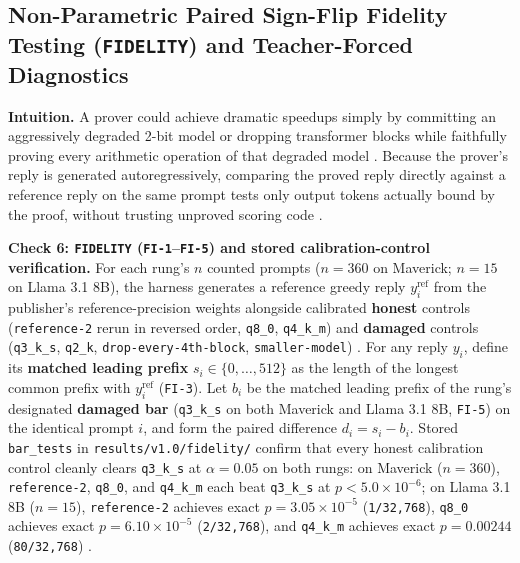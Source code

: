 \documentclass[11pt,letterpaper]{article}
\begin{document}
\subsection{Non-Parametric Paired Sign-Flip Fidelity Testing (\texttt{FIDELITY}) and Teacher-Forced Diagnostics}

\textbf{Intuition.} A prover could achieve dramatic speedups simply by committing an aggressively degraded 2-bit model or dropping transformer blocks while faithfully proving every arithmetic operation of that degraded model \cite{iproofs2026,rinberg2026flashprove}. Because the prover's reply is generated autoregressively, comparing the proved reply directly against a reference reply on the same prompt tests only output tokens actually bound by the proof, without trusting unproved scoring code \cite{iproofs2026}.

\textbf{Check 6: \texttt{FIDELITY} (\texttt{FI-1}--\texttt{FI-5}) and stored calibration-control verification.} For each rung's $n$ counted prompts ($n = 360$ on Maverick; $n = 15$ on Llama 3.1 8B), the harness generates a reference greedy reply $y_i^{\text{ref}}$ from the publisher's reference-precision weights alongside calibrated \textbf{honest} controls (\texttt{reference-2} rerun in reversed order, \texttt{q8\_\allowbreak{}0}, \texttt{q4\_\allowbreak{}k\_\allowbreak{}m}) and \textbf{damaged} controls (\texttt{q3\_\allowbreak{}k\_\allowbreak{}s}, \texttt{q2\_\allowbreak{}k}, \texttt{drop-\allowbreak{}every-4th-\allowbreak{}block}, \texttt{smaller-\allowbreak{}model}) \cite{iproofs2026}. For any reply $y_i$, define its \textbf{matched leading prefix} $s_i \in \{0, \dots, 512\}$ as the length of the longest common prefix with $y_i^{\text{ref}}$ (\texttt{FI-3}). Let $b_i$ be the matched leading prefix of the rung's designated \textbf{damaged bar} (\texttt{q3\_\allowbreak{}k\_\allowbreak{}s} on both Maverick and Llama 3.1 8B, \texttt{FI-5}) on the identical prompt $i$, and form the paired difference $d_i = s_i - b_i$. Stored \texttt{bar\_\allowbreak{}tests} in \texttt{results/\allowbreak{}v1.0/\allowbreak{}fidelity/} confirm that every honest calibration control cleanly clears \texttt{q3\_\allowbreak{}k\_\allowbreak{}s} at $\alpha = 0.05$ on both rungs: on Maverick ($n = 360$), \texttt{reference-2}, \texttt{q8\_\allowbreak{}0}, and \texttt{q4\_\allowbreak{}k\_\allowbreak{}m} each beat \texttt{q3\_\allowbreak{}k\_\allowbreak{}s} at $p < 5.0 \times 10^{-6}$; on Llama 3.1 8B ($n = 15$), \texttt{reference-2} achieves exact $p = 3.05 \times 10^{-5}$ (\texttt{1/\allowbreak{}32,768}), \texttt{q8\_\allowbreak{}0} achieves exact $p = 6.10 \times 10^{-5}$ (\texttt{2/\allowbreak{}32,768}), and \texttt{q4\_\allowbreak{}k\_\allowbreak{}m} achieves exact $p = 0.00244$ (\texttt{80/\allowbreak{}32,768}) \cite{iproofs2026}.
\end{document}
